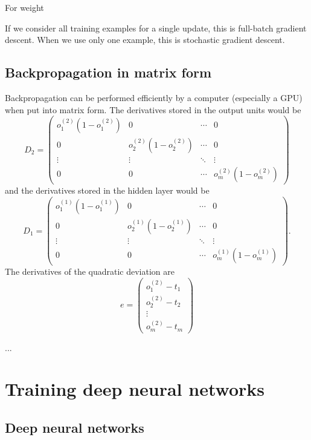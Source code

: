 \documentclass[a4paper,12pt]{article}
\begin{document}
For weight 

If we consider all training examples for a single update, this is full-batch gradient descent. When we use only one example, this is stochastic gradient descent. 

\subsection{Backpropagation in matrix form}

Backpropagation can be performed efficiently by a computer (especially a GPU) when put into matrix form. The derivatives stored in the output units would be
$$D_2 = \begin{pmatrix}
   o_1^{(2)}(1 - o_1^{(2)}) & 0 & \cdots & 0 \\
   0 & o_2^{(2)}(1 - o_2^{(2)}) & \cdots & 0 \\
   \vdots & \vdots & \ddots & \vdots\\
   0 & 0 & \cdots & o_m^{(2)}(1 - o_m^{(2)})
\end{pmatrix}$$
and the derivatives stored in the hidden layer would be
$$D_1 = \begin{pmatrix}
   o_1^{(1)}(1 - o_1^{(1)}) & 0 & \cdots & 0 \\
   0 & o_2^{(1)}(1 - o_2^{(1)}) & \cdots & 0 \\
   \vdots & \vdots & \ddots & \vdots\\
   0 & 0 & \cdots & o_m^{(1)}(1 - o_m^{(1)})
\end{pmatrix}.$$
The derivatives of the quadratic deviation are 
$$e = \begin{pmatrix}
o_1^{(2)} - t_1\\
o_2^{(2)} - t_2\\
\vdots\\
o_m^{(2)} - t_m
\end{pmatrix}$$

...



\clearpage

\section{Training deep neural networks}

\subsection{Deep neural networks}
\end{document}
